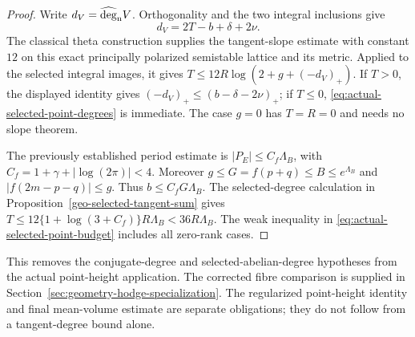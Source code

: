 \begin{proof}
Write $d_V=\widehat{\deg}_{\rm n}V$. Orthogonality and the two
integral inclusions give
\[
                        d_V=2T-b+\delta+2\nu.
\]
The classical theta construction supplies the tangent-slope estimate
with constant $12$ on this exact principally polarized semistable
lattice and its metric. Applied to the selected integral images,
it gives $T\le12R\log(2+g+(-d_V)_+)$. If $T>0$, the displayed
identity gives $(-d_V)_+\le(b-\delta-2\nu)_+$; if $T\le0$,
\eqref{eq:actual-selected-point-degrees} is immediate. The case
$g=0$ has $T=R=0$ and needs no slope theorem.

The previously established period estimate is
$|P_E|\le C_f\Lambda_B$, with
$C_f=1+\gamma+|\log(2\pi)|<4$. Moreover
$g\le G=f(p+q)\le B\le e^{\Lambda_B}$ and
$|f(2m-p-q)|\le g$. Thus $b\le C_fG\Lambda_B$.
The selected-degree calculation in
Proposition~\ref{geo-selected-tangent-sum} gives
$T\le12\{1+\log(3+C_f)\}R\Lambda_B<36R\Lambda_B$.
The weak inequality in \eqref{eq:actual-selected-point-budget}
includes all zero-rank cases.
\end{proof}

This removes the conjugate-degree and selected-abelian-degree
hypotheses from the actual point-height application. The corrected fibre comparison is supplied in
Section~\ref{sec:geometry-hodge-specialization}. The regularized
point-height identity and final mean-volume estimate are separate
obligations; they do not follow from a tangent-degree bound alone.
